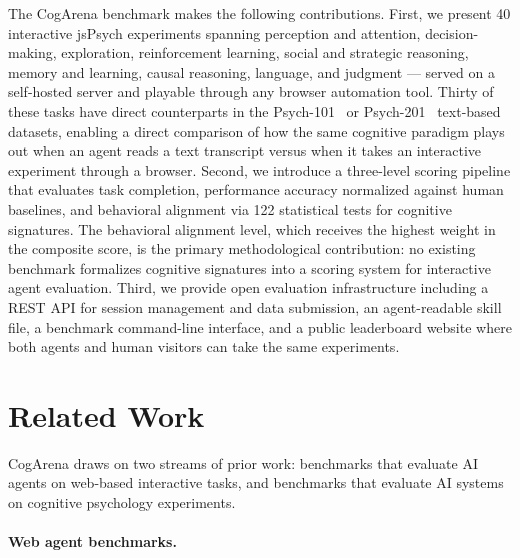 \documentclass{article}
\begin{document}
The CogArena benchmark makes the following contributions. First, we present 40 interactive jsPsych experiments spanning perception and attention, decision-making, exploration, reinforcement learning, social and strategic reasoning, memory and learning, causal reasoning, language, and judgment --- served on a self-hosted server and playable through any browser automation tool. Thirty of these tasks have direct counterparts in the Psych-101~\citep{binz2024psych101} or Psych-201~\citep{binz2025psych201} text-based datasets, enabling a direct comparison of how the same cognitive paradigm plays out when an agent reads a text transcript versus when it takes an interactive experiment through a browser. Second, we introduce a three-level scoring pipeline that evaluates task completion, performance accuracy normalized against human baselines, and behavioral alignment via 122 statistical tests for cognitive signatures. The behavioral alignment level, which receives the highest weight in the composite score, is the primary methodological contribution: no existing benchmark formalizes cognitive signatures into a scoring system for interactive agent evaluation. Third, we provide open evaluation infrastructure including a REST API for session management and data submission, an agent-readable skill file, a benchmark command-line interface, and a public leaderboard website where both agents and human visitors can take the same experiments.

\section{Related Work}
\label{sec:related}

CogArena draws on two streams of prior work: benchmarks that evaluate AI agents on web-based interactive tasks, and benchmarks that evaluate AI systems on cognitive psychology experiments.

\paragraph{Web agent benchmarks.}
\end{document}
